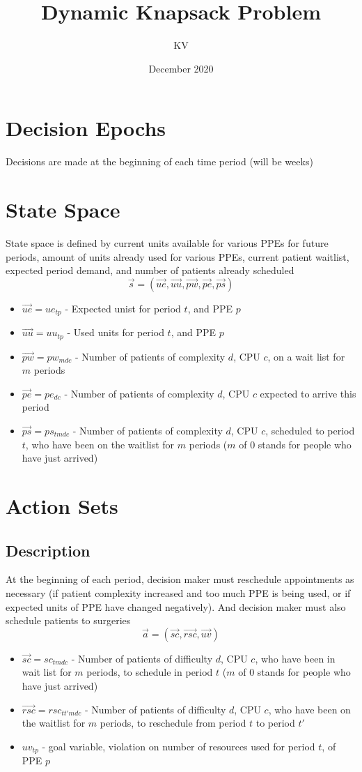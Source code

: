 \documentclass{article}
\title{Dynamic Knapsack Problem}
\author{KV}
\date{December 2020}
\begin{document}
\maketitle

\section{Decision Epochs}
Decisions are made at the beginning of each time period (will be weeks)

\section{State Space}
State space is defined by current units available for various PPEs for future periods, amount of units already used for various PPEs, current patient waitlist, expected period demand, and number of patients already scheduled
\[ \vec{s}  = (\vec{ue}, \vec{uu}, \vec{pw}, \vec{pe}, \vec{ps})\]
\begin{itemize}
    \item $\vec{ue} = ue_{tp}$ - Expected unist for period $t$, and PPE $p$
    \item $\vec{uu} = uu_{tp}$ - Used units for period $t$, and PPE $p$
    \item $\vec{pw} = pw_{mdc}$ - Number of patients of complexity $d$, CPU $c$, on a wait list for $m$ periods
    \item $\vec{pe} = pe_{dc}$ - Number of patients of complexity $d$, CPU $c$ expected to arrive this period
    \item $\vec{ps} = ps_{tmdc}$ - Number of patients of complexity $d$, CPU $c$, scheduled to period $t$, who have been on the waitlist for $m$ periods ($m$ of 0 stands for people who have just arrived)
\end{itemize}

\section{Action Sets}

\subsection{Description}
At the beginning of each period, decision maker must reschedule appointments as necessary (if patient complexity increased and too much PPE is being used, or if expected units of PPE have changed negatively). And decision maker must also schedule patients to surgeries
\[ \vec{a} = (\vec{sc}, \vec{rsc}, \vec{uv}) \]
\begin{itemize}
    \item $\vec{sc} = sc_{tmdc}$ - Number of patients of difficulty $d$, CPU $c$, who have been in wait list for $m$ periods, to schedule in period $t$ ($m$ of 0 stands for people who have just arrived)
	\item $\vec{rsc} = rsc_{tt'mdc}$ - Number of patients of difficulty $d$, CPU $c$, who have been on the waitlist for $m$ periods, to reschedule from period $t$ to period $t'$
	\item $uv_{tp}$ - goal variable, violation on number of resources used for period $t$, of PPE $p$
\end{itemize}
\end{document}
